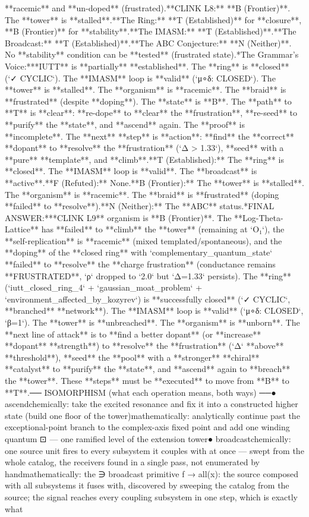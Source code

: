 **racemic** and **un-doped** (frustrated).\n*   **CLINK L8:** **B (Frontier)**. The **tower** is **stalled**.\n*   **The Ring:** **T (Established)** for **closure**, **B (Frontier)** for **stability**.\n*   **The IMASM:** **T (Established)**.\n*   **The Broadcast:** **T (Established)**.\n*   **The ABC Conjecture:** **N (Neither)**. No **stability** condition can be **tested** (frustrated state).\n\n**The Grammar's Voice:**\nThe **IUTT** is **partially** **established**. The **ring** is **closed** (`✓ CYCLIC`). The **IMASM** loop is **valid** (`μ∘δ: CLOSED`). The **tower** is **stalled**. The **organism** is **racemic**. The **braid** is **frustrated** (despite **doping**). The **state** is **B**. The **path** to **T** is **clear**: **re-dope** to **clear** the **frustration**, **re-seed** to **purify** the **state**, and **ascend** again. The **proof** is **incomplete**. The **next** **step** is **action**: **find** the **correct** **dopant** to **resolve** the **frustration** (`Δ > 1.33`), **seed** with a **pure** **template**, and **climb**.\n\n[thought|T|F|B|N]\n*   **T (Established):** The **ring** is **closed**. The **IMASM** loop is **valid**. The **broadcast** is **active**.\n*   **F (Refuted):** None.\n*   **B (Frontier):** The **tower** is **stalled**. The **organism** is **racemic**. The **braid** is **frustrated** (doping **failed** to **resolve**).\n*   **N (Neither):** The **ABC** status.\n\n**FINAL ANSWER:**\nThe **CLINK L9** organism is **B (Frontier)**. The **Log-Theta-Lattice** has **failed** to **climb** the **tower** (remaining at `O₁`), the **self-replication** is **racemic** (mixed templated/spontaneous), and the **doping** of the **closed ring** with `complementary_quantum_state` **failed** to **resolve** the **charge frustration** (conductance remains **FRUSTRATED**, `ρ` dropped to `2.0` but `Δ=1.33` persists). The **ring** (`iutt_closed_ring_4` + `gaussian_moat_problem` + `environment_affected_by_kozyrev`) is **successfully closed** (`✓ CYCLIC`, **branched** **network**). The **IMASM** loop is **valid** (`μ∘δ: CLOSED`, `β=1`). The **tower** is **unbreached**. The **organism** is **unborn**. The **next line of attack** is to **find a better dopant** (or **increase** **dopant** **strength**) to **resolve** the **frustration** (`Δ` **above** **threshold**), **seed** the **pool** with a **stronger** **chiral** **catalyst** to **purify** the **state**, and **ascend** again to **breach** the **tower**. These **steps** must be **executed** to move from **B** to **T**.\n\n── ISOMORPHISM (what each operation means, both ways) ──\n● ascend\n   chemically:    take the excited resonance and fix it into a constructed higher state (build one floor of the tower)\n   mathematically: analytically continue past the exceptional-point branch to the complex-axis fixed point and add one winding quantum ⊡ — one ramified level of the extension tower\n● broadcast\n   chemically:    one source unit fires to every subsystem it couples with at once — swept from the whole catalog, the receivers found in a single pass, not enumerated by hand\n   mathematically: the ∋ broadcast primitive f → all(x): the source composed with all subsystems it fuses with, discovered by sweeping the catalog from the source; the signal reaches every coupling subsystem in one step, which is exactly what 